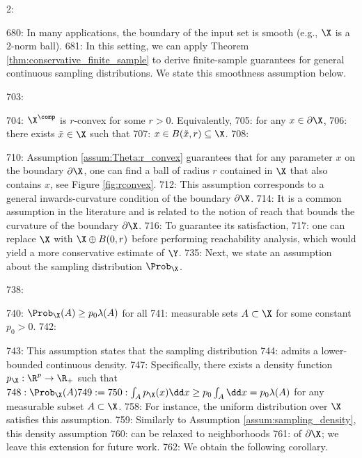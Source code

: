 2: \documentclass[12pt]{l4dc2022} %
\begin{document}
680: In many applications, the boundary of the input set is smooth (e.g., $\X$ is a $2$-norm ball). 
681: In this setting, we can apply Theorem \ref{thm:conservative_finite_sample} to derive finite-sample guarantees for general continuous sampling distributions. We state this smoothness assumption below.

703: \begin{myassumption}\label{assum:Theta:r_convex} 
704: $\X^\comp$ is $r$-convex for some $r>0$. Equivalently, 
705: for any $x\in\partial\X$, 
706:  there exists $\tilde{x}\in\X$ such that 
707:  $x\in B(\tilde{x},r)\subseteq \X$.
708: \end{myassumption}
710: Assumption \ref{assum:Theta:r_convex} guarantees that for any parameter $x$ on the boundary $\partial\X$, one can find a ball of radius $r$ contained in $\X$ that also contains $x$, see Figure \ref{fig:rconvex}. 
712: This assumption corresponds to a general inwards-curvature condition of the boundary $\partial\X$. 
714: It is a common assumption in the literature \citep{Walther1997,Rodriguez2016,RodriguezCasal2019,AriasCastro2019} and is related to the notion of reach \citep{Federer1959,Cuevas2009,AamariPhD2017} that bounds the curvature of the boundary $\partial\X$. 
716: To guarantee its satisfaction, 
717: one can replace $\X$ with $\X\oplus B(0,r)$ \citep{Walther1997} before performing reachability analysis, which would yield a more conservative estimate of $\Y$. %
735: Next, we state an assumption about the sampling distribution $\Prob_\X$.

738:  \begin{myassumption}\label{assum:sampling_density:cor}
740: $\Prob_\X(A)\geq p_0\lambda(A)$ for all  
741:  	measurable sets $A\subset\X$ for some constant $p_0>0$.
742:  \end{myassumption}
743: This assumption states that the sampling distribution %
744: admits a lower-bounded continuous density. 
747:  Specifically, there exists a density function $p_\X:\R^p\rightarrow\R_+$ such that $ 
748: \Prob_\X(A)
749: =
750: \int_{A} p_{\X}(x)\dd x\geq p_0\int_{A} \dd x=p_0\lambda(A)$ for any measurable subset $A\subset\X$. 
758: For instance, the uniform distribution over $\X$ satisfies this assumption. 
759: Similarly to Assumption \ref{assum:sampling_density}, this density assumption %
760: can be relaxed to neighborhoods %
761: of $\partial\X$; we leave this extension for future work.  
762: We obtain the following corollary.
\end{document}
